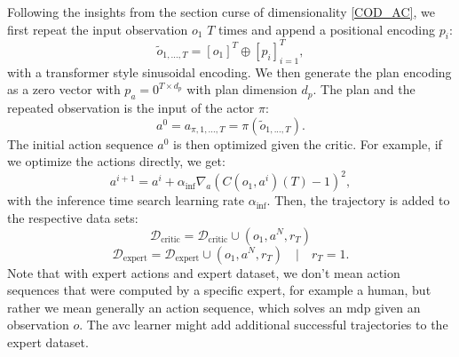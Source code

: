 Following the insights from the section curse of dimensionality \ref{COD_AC}, we first repeat the input observation $o_1$ $T$ times and append a positional encoding $p_i$:
\begin{equation}
    \label{eq:seq_emb}
    \tilde{o}_{1, ..., T} = [o_1]^T \oplus [p_i]_{i=1}^T,
\end{equation}
with a transformer style sinusoidal encoding.
We then generate the plan encoding as a zero vector with $p_a = 0^{T \times d_p}$ with plan dimension $d_p$. The plan and the repeated observation is the input 
of the actor $\pi$:
\begin{equation}
    a^0 = a_{\pi, 1,...,T} = \pi(\tilde{o}_{1, ..., T}).
\end{equation}
The initial action sequence $a^0$ is then optimized given the critic. For example, if we optimize the actions directly, we get:
\begin{equation*}
    a^{i+1} = a^i + \alpha_{\mathrm{inf}}\nabla_{a} (C(o_1, a^i)(T) - 1)^2,
\end{equation*}
with the inference time search learning rate $\alpha_{\mathrm{inf}}$. Then, the trajectory is added to the respective data sets:
\begin{equation}
    \mathcal{D}_{\text{critic}} = \mathcal{D}_{\text{critic}} \cup (o_1, a^N, r_T)
\end{equation}
\begin{equation*}
    \mathcal{D}_{\text{expert}} = \mathcal{D}_{\text{expert}} \cup (o_1, a^N, r_T)\quad |\quad r_T = 1.
\end{equation*}
Note that with expert actions and expert dataset, we don't mean action sequences that were computed by 
a specific expert, for example a human, but rather we mean generally an action sequence, which solves an \ac{mdp} given an observation $o$. The \ac{avc} learner might add 
additional successful trajectories to the expert dataset. \\

